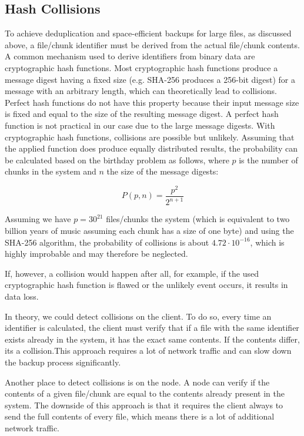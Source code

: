 
\subsection{Hash Collisions}
To achieve deduplication and space-efficient backups for large files, as discussed above, a file/chunk identifier must be derived from the actual file/chunk contents. 
A common mechanism used to derive identifiers from binary data are cryptographic hash functions. Most cryptographic hash functions produce a message digest having a fixed size (e.g. SHA-256\cite{sha-256} produces a 256-bit digest) for a message with an arbitrary length, which can theoretically lead to collisions.
Perfect hash functions do not have this property because their input message size is fixed and equal to the size of the resulting message digest. A perfect hash function is not practical in our case due to the large message digests.
With cryptographic hash functions, collisions are possible but unlikely. Assuming that the applied function does produce equally distributed results, the probability can be calculated based on the birthday problem\cite{birthday-attack} as follows, where $p$ is the number of chunks in the system and $n$ the size of the message digests:

\[
P(p, n) = \frac{p^2}{2^{n+1}}
\]

Assuming we have $p=30^{21}$ files/chunks the system (which is equivalent to two billion years of music assuming each chunk has a size of one byte\cite{seagate-zetabyte}) and using the SHA-256 algorithm, the probability of collisions is about $4.72 \cdot 10^{-16}$, which is highly improbable and may therefore be neglected.

If, however, a collision would happen after all, for example, if the used cryptographic hash function is flawed or the unlikely event occurs, it results in data loss.

In theory, we could detect collisions on the client. To do so, every time an identifier is calculated, the client must verify that if a file with the same identifier exists already in the system, it has the exact same contents. If the contents differ, its a collision.This approach requires a lot of network traffic and can slow down the backup process significantly.

Another place to detect collisions is on the node. A node can verify if the contents of a given file/chunk are equal to the contents already present in the system. The downside of this approach is that it requires the client always to send the full contents of every file, which means there is a lot of additional network traffic.

